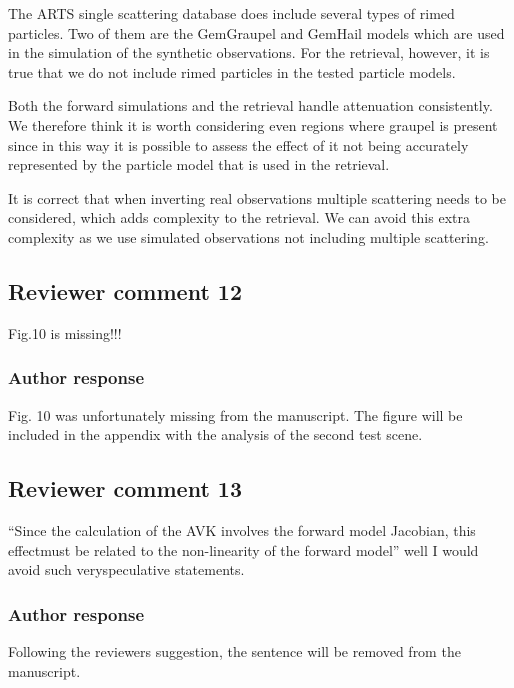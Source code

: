 \documentclass[11pt]{scrartcl}
\begin{document}
The ARTS single scattering database does include several types of rimed
particles. Two of them are the GemGraupel and GemHail models which are used in
the simulation of the synthetic observations. For the retrieval, however, it is
true that we do not include rimed particles in the tested particle models.

Both the forward simulations and the retrieval handle attenuation consistently.
We therefore think it is worth considering even regions where graupel is present
since in this way it is possible to assess the effect of it not being accurately
represented by the particle model that is used in the retrieval.

It is correct that when inverting real observations multiple scattering needs to be
considered, which adds complexity to the retrieval. We can avoid this extra complexity as
we use simulated observations not including multiple scattering.

\subsection*{Reviewer comment 12}

Fig.10 is missing!!!

\subsubsection*{Author response}

Fig. 10 was unfortunately missing from the manuscript. The figure will be included in the appendix
with the analysis of the second test scene.


\subsection*{Reviewer comment 13}
 “Since the calculation of the AVK involves the forward model Jacobian, this effectmust be related to the non-linearity of the forward model” well I would avoid such veryspeculative statements.

\subsubsection*{Author response}

Following the reviewers suggestion, the sentence will be removed from the manuscript.
\end{document}
